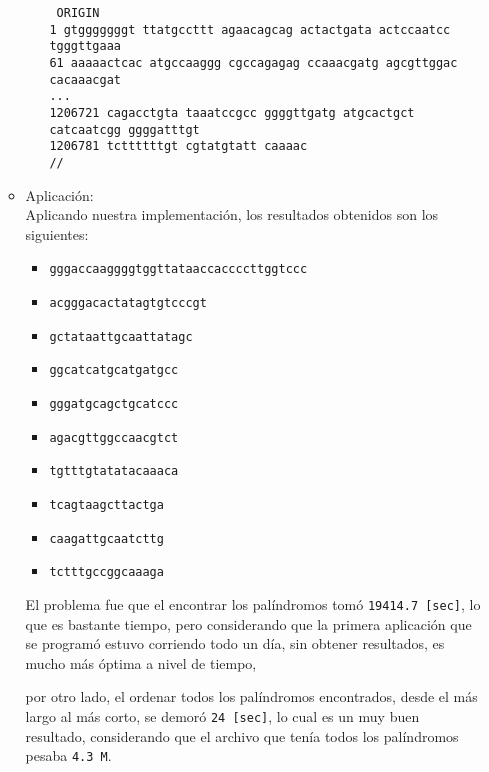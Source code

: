 \begin{enumerate}
\begin{itemize}
\begin{itemize}
					\texttt{
					ORIGIN\\ 
		        1 gtgggggggt ttatgccttt agaacagcag actactgata actccaatcc tgggttgaaa\\
		      	61 aaaaactcac atgccaaggg cgccagagag ccaaacgatg agcgttggac cacaaacgat\\
				...\\
				1206721 cagacctgta taaatccgcc ggggttgatg atgcactgct catcaatcgg ggggatttgt\\
  				1206781 tcttttttgt cgtatgtatt caaaac\\
					//
					}
				\end{itemize}

			\item Aplicación:\\

				Aplicando nuestra implementación, los resultados obtenidos son los siguientes:

				\begin{itemize}
					\item \texttt{gggaccaaggggtggttataaccaccccttggtccc}
					\item \texttt{acgggacactatagtgtcccgt}
					\item \texttt{gctataattgcaattatagc}
					\item \texttt{ggcatcatgcatgatgcc}
					\item \texttt{gggatgcagctgcatccc}
					\item \texttt{agacgttggccaacgtct}
					\item \texttt{tgtttgtatatacaaaca}
					\item \texttt{tcagtaagcttactga}
					\item \texttt{caagattgcaatcttg}
					\item \texttt{tctttgccggcaaaga}
				\end{itemize}
		
				El problema fue que el encontrar los palíndromos tomó \texttt{19414.7 [sec]},
				lo que es bastante tiempo, pero considerando que la primera aplicación que se
				programó estuvo corriendo todo un día, sin obtener resultados, es mucho más
				óptima a nivel de tiempo,

				por otro lado, el ordenar todos los palíndromos encontrados, desde el más
				largo al más corto, se demoró \texttt{24 [sec]}, lo cual es un muy buen
				resultado, considerando que el archivo que tenía todos los palíndromos
				pesaba \texttt{4.3 M}.
	
		\end{itemize}


\end{enumerate}
